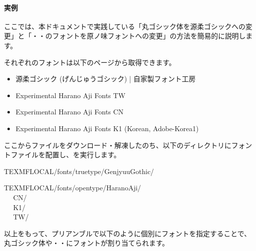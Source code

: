 \documentclass[../supplement]{subfiles}
\begin{document}
\paragraph{実例}

ここでは、本ドキュメントで実践している「丸ゴシック体を源柔ゴシックへの変更」と「・・のフォントを原ノ味フォントへの変更」の方法を簡易的に説明します。

それぞれのフォントは以下のページから取得できます。

\begin{itemize}
  \item 源柔ゴシック (げんじゅうゴシック) | 自家製フォント工房
  \item Experimental Harano Aji Fonts TW
  \item Experimental Harano Aji Fonts CN
  \item Experimental Harano Aji Fonts K1 (Korean, Adobe-Korea1)
\end{itemize}

ここからファイルをダウンロード・解凍したのち、以下のディレクトリにフォントファイルを配置し、を実行します。

\begin{directory}
\textdollar TEXMFLOCAL/fonts/truetype/GenjyuuGothic/
\end{directory}

\begin{directory}
\textdollar TEXMFLOCAL/fonts/opentype/HaranoAji/\\[-0.5zw]
　 CN/\\[-0.5zw]
　 K1/\\[-0.5zw]
　 TW/
\end{directory}

以上をもって、プリアンブルで以下のように個別にフォントを指定することで、{\mgfamily 丸ゴシック体}や・・にフォントが割り当てられます。
\end{document}
